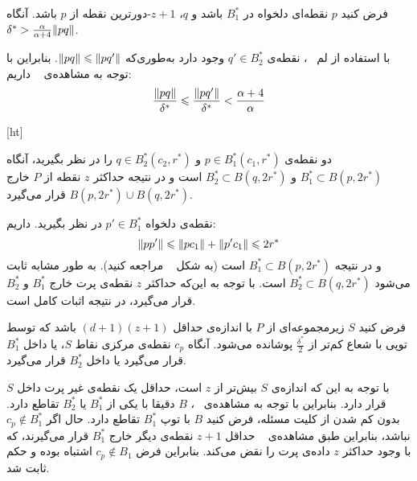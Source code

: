 
فرض کنید $p$ نقطه‌ای دلخواه در $B_1^*$ باشد و $q$، $z+1$-دورترین نقطه از $p$ باشد.
آنگاه $\delta^* > \frac{\alpha}{\alpha + 4}\|{pq}\|$.


با استفاده از لم ~، نقطه‌ی $q' \in B_2^*$ وجود دارد به‌طوری‌که $\|{pq}\| \leqslant \|{pq'}\|$.
بنابراین با توجه به مشاهده‌ی ~ داریم:
$$\frac{\|{pq}\|}{\delta^*} \leqslant \frac{\|{pq'}\|}{\delta^*} < \frac{\alpha + 4}{\alpha}$$



[ht]

دو نقطه‌ی $p \in B_1^*(c_1, r^*)$ و $q \in B_2^*(c_2, r^*)$ را در نظر بگیرید، آنگاه $B_1^* \subset B(p, 2r^*)$ و $B_2^* \subset B(q, 2r^*)$ است و در نتیجه حداکثر $z$ نقطه از $P$ خارج $B(p, 2r^*) \cup B(q, 2r^*)$ قرار می‌گیرد. 

 
 نقطه‌ی دلخواه $p' \in B_1^*$ در نظر بگیرید. داریم:
 $$\|{pp'}\| \leqslant \|{pc_1}\| + \|{p'c_1}\| \leqslant 2r^*$$
 و در نتیجه $B_1^* \subset B(p, 2r^*)$ است (به شکل ~ مراجعه کنید).
 به طور مشابه ثابت می‌شود $B_2^* \subset B(q, 2r^*)$ است.
 با توجه به این‌که حداکثر $z$ نقطه‌ی پرت خارج $B_1^*$ و $B_2^*$ قرار می‌گیرد، در نتیجه اثبات کامل است.




فرض کنید $S$ زیرمجموعه‌ای از $P$ با اندازه‌ی حداقل $(d+1)(z+1)$ باشد که توسط توپی با شعاع کم‌تر از $\frac{\delta^*}{2}$ پوشانده می‌شود.
آنگاه $c_p$ نقطه‌ی مرکزی نقاط $S$، یا داخل $B_1^*$ قرار می‌گیرد یا داخل $B_2^*$ قرار می‌گیرد.


با توجه به این که اندازه‌ی $S$ بیش‌تر از $z$ است، حداقل یک نقطه‌ی غیر پرت داخل $S$ قرار دارد.
بنابراین با توجه به مشاهده‌ی ~، $B$ دقیقا با یکی از $B_1^*$ یا $B_2^*$ تقاطع دارد.
بدون کم شدن از کلیت مسئله، فرض کنید $B$ با توپ $B_1^*$ تقاطع دارد.
حال اگر $c_p \not \in B_1^*$ نباشد، بنابراین طبق مشاهده‌ی ~ حداقل $ z+1$ نقطه‌ی دیگر خارج $B_1^*$ قرار می‌گیرند، که با وجود حداکثر $z$ داده‌ی پرت را نقض می‌کند.
بنابراین فرض $c_p \not \in B_1$ اشتباه بوده و حکم ثابت شد.

